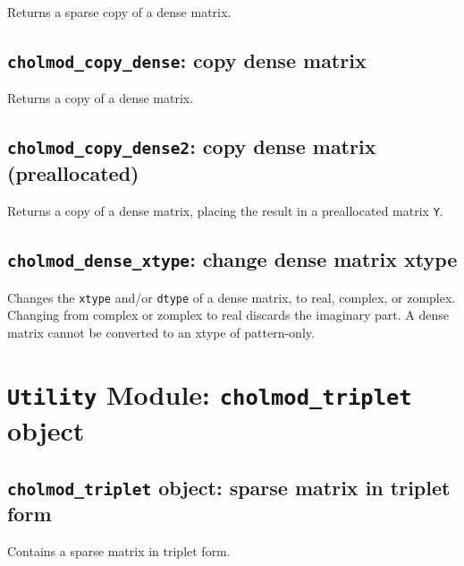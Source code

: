 \documentclass[11pt]{article}
\begin{document}

Returns a sparse copy of a dense matrix.

\subsection{{\tt cholmod\_copy\_dense}: copy dense matrix}


Returns a copy of a dense matrix.

\subsection{{\tt cholmod\_copy\_dense2}: copy dense matrix (preallocated)}


Returns a copy of a dense matrix, placing the result in a preallocated matrix
{\tt Y}.

\subsection{{\tt cholmod\_dense\_xtype}: change dense matrix xtype}


Changes the {\tt xtype} and/or {\tt dtype} of a dense matrix, to real, complex,
or zomplex.  Changing from complex or zomplex to real discards the imaginary
part.  A dense matrix cannot be converted to an xtype of pattern-only.

\newpage \section{{\tt Utility} Module: {\tt cholmod\_triplet} object}
\label{cholmod_triplet}

\subsection{{\tt cholmod\_triplet} object: sparse matrix in triplet form}


Contains a sparse matrix in triplet form.
\end{document}
